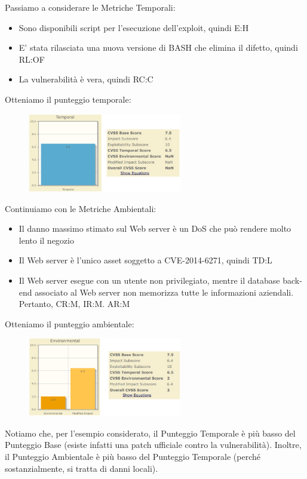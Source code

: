 Passiamo a considerare le Metriche Temporali:
\begin{itemize}
    \item Sono disponibili script per l’esecuzione dell’exploit,
quindi E:H
    \item E’ stata rilasciata una nuova versione di BASH che
elimina il difetto, quindi RL:OF
    \item La vulnerabilità è vera, quindi RC:C 
\end{itemize}
Otteniamo il punteggio temporale:

\begin{figure}[hbpt!]
    \centering
    \includegraphics[width=0.6\textwidth]{./Images/cap2/2.22.png}
\end{figure}
\FloatBarrier

Continuiamo con le Metriche Ambientali:
\begin{itemize}
    \item Il danno massimo stimato sul Web server è un
DoS che può rendere molto lento il negozio
    \item Il Web server è l’unico asset soggetto a
CVE-2014-6271, quindi TD:L 
    \item Il Web server esegue con un utente non privilegiato, mentre il database back-end associato al Web server non
memorizza tutte le informazioni aziendali. Pertanto, CR:M, IR:M. AR:M 
\end{itemize}
Otteniamo il punteggio ambientale:

\begin{figure}[hbpt!]
    \centering
    \includegraphics[width=0.6\textwidth]{./Images/cap2/2.23.png}
\end{figure}
\FloatBarrier
Notiamo che, per l’esempio considerato,
il Punteggio Temporale è più basso del
Punteggio Base (esiste infatti una patch ufficiale contro la
vulnerabilità). Inoltre, il Punteggio Ambientale è più basso
del Punteggio Temporale (perché sostanzialmente, si tratta di danni locali).

\let\cleardoublepage\clearpage
